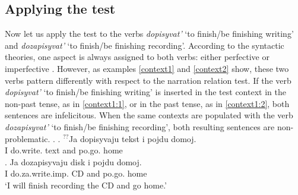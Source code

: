 %
%

\subsection{Applying the test}\label{subsection:bi:apply}
Now let us apply the test to the verbs \textit{dopisyvat'} `to finish/be finishing writing' and \textit{dozapisyvat'} `to finish/be finishing recording'. According to the syntactic theories, one aspect is always assigned to both verbs: either perfective \citep{Ramchand:04, Romanova:04, Svenonius:04b} or imperfective \citep{Tatevosov:07, Tatevosov:09}. However, as examples \ref{context1} and \ref{context2} show, these two verbs pattern differently with respect to the narration relation test. If the verb \textit{dopisyvat'} `to finish/be finishing writing' is inserted in the test context in the non-past tense, as in \ref{context1:1}, or in the past tense, as in \ref{context1:2}, both sentences are infelicitous. When the same contexts are populated with the verb \textit{dozapisyvat'} `to finish/be finishing recording', both resulting sentences are non-problematic.
\ex.\label{context1} \ag. \label{context1:1}$^{??}$Ja dopisyvaju tekst i pojdu\textsuperscript{\PF} domoj.\\
{}I do.write. text and po.go. home\\
\bg. \label{context2:1}Ja dozapisyvaju disk i pojdu\textsuperscript{\PF} domoj.\\
I do.za.write.imp. CD and po.go. home\\
\trans `I will finish recording the CD and go home.'

